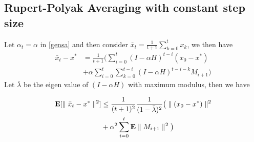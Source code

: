\subsection{Rupert-Polyak Averaging with constant step size}
Let $\alpha_t=\alpha$ in \eqref{gensa} and then consider $\bar{x}_t=\frac{1}{t+1}\sum_{k=0}^t x_k$, we then have
\begin{align*}
\bar{x}_t-x^*&=\frac{1}{t+1}\big(\sum_{i=0}^t (I-\alpha H)^{t-i}(x_0-x^*)\\&+\alpha \sum_{i=0}^t \sum_{k=0}^{t-i} (I-\alpha H)^{t-i-k} M_{i+1}\big)
\end{align*}
Let $\bar{\lambda}$ be the eigen value of $(I-\alpha H)$ with maximum modulus, then we have
\begin{comment}
\begin{align*}
\begin{split}
|\E[\bar{x}_t-x^*]|&=|\frac{1}{t+1}\big(\sum_{i=0}^t (I-\alpha H)^{t-i}(x_0-x^*)|\\
&\leq \frac{1}{t+1}\frac{1}{1-\bar{\lambda}}|x_0-x^*|
\end{split}
\end{align*}
\end{comment}
\begin{align}\label{rates}
\begin{split}
\mathbf{E}[\parallel\bar{x}_t-x^*\parallel^2]&\leq\frac{1}{(t+1)^2}\frac{1}{(1-\bar{\lambda})^2} \big(\parallel(x_0-x^*)\parallel^2\\&+ \alpha^2\sum_{i=0}^t \mathbf{E}\parallel M_{i+1}\parallel^2\big)
\end{split}
\end{align}
\begin{comment}
\begin{itemize}
\item When all eigen values of $H$ have positive real parts, then for diminishing step sizes \eqref{gensa} tracks the ODE $\dot{x}(t)=(g-Hx(t))$. Suppose the eigen value of $H$ with smallest real part, say $\mu$ had no imaginary component, then it dictates the asymptotic rate of the ODE. Similarly, the modulus of the eigen value dictates the rate at which the bias is forgotten in \eqref{rates}. Further, in the case when the eigen value of $H$ with smallest real part, say $\mu$ had no imaginary component, then the rate in \eqref{rates} is then dictated by $\bar{\lambda}=(I-\alpha\mu)$. 
\item Given that the rates with respect to time are the same for all the stochastic approximation schemes of the form \eqref{gensa}, algorithms can be designed using the following criteria:
\begin{enumerate}
\item Designing $H$ and $g$ so that $H^{-1}g$ is equal to the TD solution.
\item Designing a desirable value of $\bar{\lambda}$ since it plays a role both in the bias as well as noise terms. 
\end{enumerate}
\end{itemize}
\subsection{Optimal Step Size}
\end{comment}